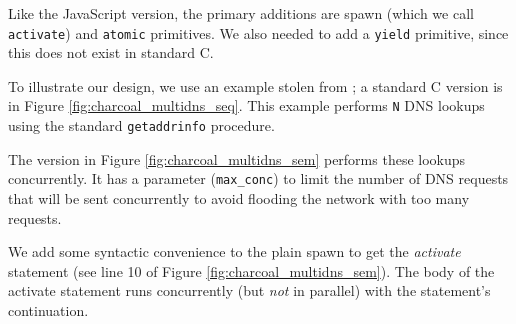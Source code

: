 \documentclass[acmsmall,anonymous,review]{acmart}\settopmatter{printfolios=true,printccs=false,printacmref=false}
\begin{document}
Like the JavaScript version, the primary additions are spawn (which we call \texttt{activate}) and \texttt{atomic} primitives.
We also needed to add a \texttt{yield} primitive, since this does not exist in standard C.

To illustrate our design, we use an example stolen from \cite{Krohn2007}; a standard C version is in Figure \ref{fig:charcoal_multidns_seq}.
This example performs \texttt{N} DNS lookups using the standard \texttt{getaddrinfo} procedure.

The \charcoal{} version in Figure \ref{fig:charcoal_multidns_sem} performs these lookups concurrently.
It has a parameter (\texttt{max\_conc}) to limit the number of DNS requests that will be sent concurrently to avoid flooding the network with too many requests.

We add some syntactic convenience to the plain spawn to get the \emph{activate} statement (see line 10 of Figure \ref{fig:charcoal_multidns_sem}).
The body of the activate statement runs concurrently (but \emph{not} in parallel) with the statement's continuation.
\end{document}
